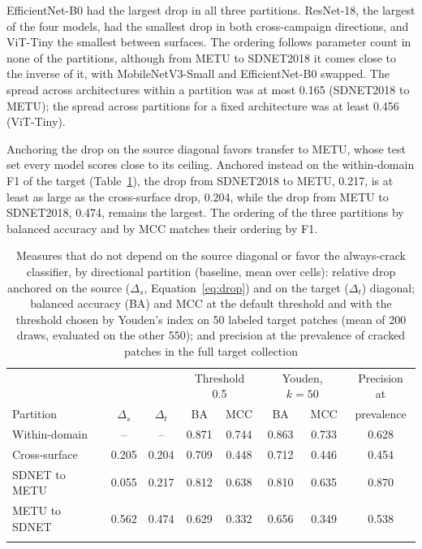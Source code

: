 \documentclass[pdflatex,sn-apa]{sn-jnl}
\begin{document}
EfficientNet-B0 had the largest drop in all three partitions. ResNet-18, the largest of the four models, had the smallest drop in both cross-campaign directions, and ViT-Tiny the smallest between surfaces. The ordering follows parameter count in none of the partitions, although from METU to SDNET2018 it comes close to the inverse of it, with MobileNetV3-Small and EfficientNet-B0 swapped. The spread across architectures within a partition was at most 0.165 (SDNET2018 to METU); the spread across partitions for a fixed architecture was at least 0.456 (ViT-Tiny).

Anchoring the drop on the source diagonal favors transfer to METU, whose test set every model scores close to its ceiling. Anchored instead on the within-domain F1 of the target (Table~\ref{tab:anchor}), the drop from SDNET2018 to METU, 0.217, is at least as large as the cross-surface drop, 0.204, while the drop from METU to SDNET2018, 0.474, remains the largest. The ordering of the three partitions by balanced accuracy and by MCC matches their ordering by F1.

\begin{table}[t]
\caption{Measures that do not depend on the source diagonal or favor the always-crack classifier, by directional partition (baseline, mean over cells): relative drop anchored on the source ($\Delta_s$, Equation~\ref{eq:drop}) and on the target ($\Delta_t$) diagonal; balanced accuracy (BA) and MCC at the default threshold and with the threshold chosen by Youden's index on 50 labeled target patches (mean of 200 draws, evaluated on the other 550); and precision at the prevalence of cracked patches in the full target collection}\label{tab:anchor}
\setlength{\tabcolsep}{3pt}
\begin{tabular*}{\textwidth}{@{\extracolsep\fill}lccccccc@{}}
\toprule
 & & & \multicolumn{2}{c}{Threshold 0.5} & \multicolumn{2}{c}{Youden, $k=50$} & Precision at \\
Partition & $\Delta_s$ & $\Delta_t$ & BA & MCC & BA & MCC & prevalence \\
\midrule
Within-domain & -- & -- & 0.871 & 0.744 & 0.863 & 0.733 & 0.628 \\
Cross-surface & 0.205 & 0.204 & 0.709 & 0.448 & 0.712 & 0.446 & 0.454 \\
SDNET to METU & 0.055 & 0.217 & 0.812 & 0.638 & 0.810 & 0.635 & 0.870 \\
METU to SDNET & 0.562 & 0.474 & 0.629 & 0.332 & 0.656 & 0.349 & 0.538 \\
\botrule
\end{tabular*}
\end{table}
\end{document}
